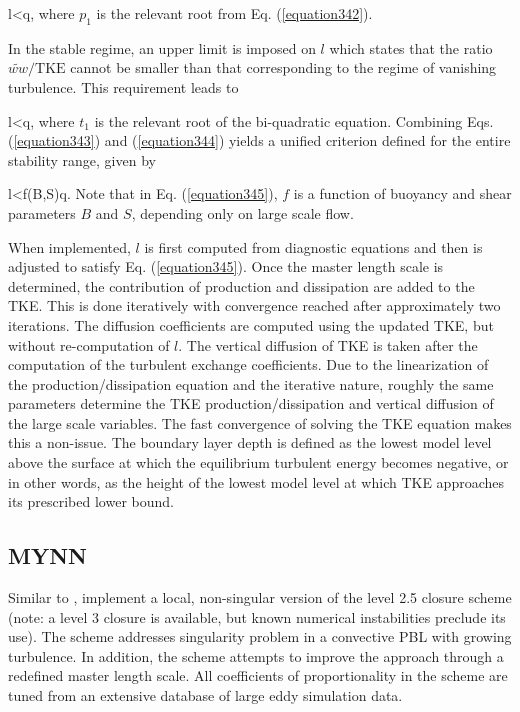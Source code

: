 \be
l<q, \label{equation343}
\ee
\noindent
 where $p_1$ is the relevant root from Eq. (\autoref{equation342}).

In the stable regime, an upper limit is imposed on $l$ which states that the ratio $\widetilde{ww}/\text{TKE}$ cannot be smaller than that corresponding to the regime of vanishing turbulence. This requirement leads to

\be
l<q, \label{equation344}
\ee
\noindent
 where $t_1$ is the relevant root of the bi-quadratic equation. Combining Eqs. (\autoref{equation343}) and (\autoref{equation344}) yields a unified criterion defined for the entire stability range, given by

\be
l<f(B,S)q. \label{equation345}
\ee
\noindent
 Note that in Eq. (\autoref{equation345}), $f$ is a function of buoyancy and shear parameters $B$ and $S$, depending only on large scale flow.

When implemented, $l$ is first computed from diagnostic equations and then is adjusted to satisfy Eq. (\autoref{equation345}). Once the master length scale is determined, the contribution of production and dissipation are added to the TKE. This is done iteratively with convergence reached after approximately two iterations. The diffusion coefficients are computed using the updated TKE, but without re-computation of $l$. The vertical diffusion of TKE is taken after the computation of the turbulent exchange coefficients. Due to the linearization of the production\slash dissipation equation and the iterative nature, roughly the same parameters determine the TKE production\slash dissipation and vertical diffusion of the large scale variables. The fast convergence of solving the TKE equation makes this a non-issue. The boundary layer depth is defined as the lowest model level above the surface at which the equilibrium turbulent energy becomes negative, or in other words, as the height of the lowest model level at which TKE approaches its prescribed lower bound.

\subsection{MYNN}
\label{pbl-mynn-363}

Similar to  \citet{Jan02},  \citet{NN01, NN04, NN06} implement a local, non-singular version of the  \citet{MY82} level 2.5 closure scheme (note: a level 3 closure is available, but known numerical instabilities preclude its use). The scheme addresses singularity problem in a convective PBL with growing turbulence. In addition, the scheme attempts to improve the  \citet{Jan02} approach through a redefined master length scale. All coefficients of proportionality in the scheme are tuned from an extensive database of large eddy simulation data.

